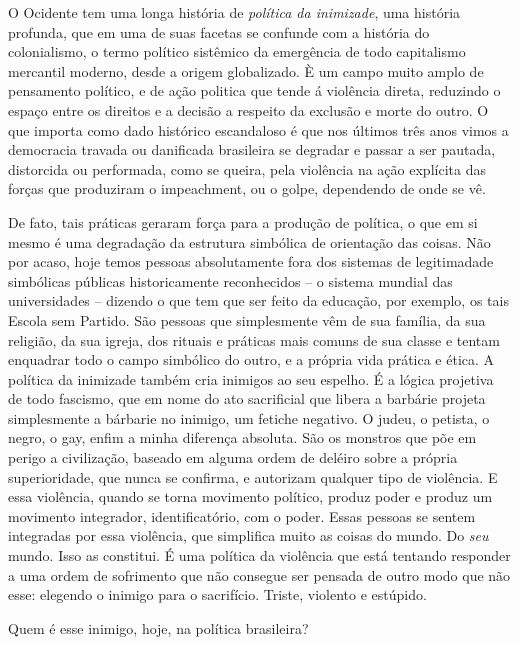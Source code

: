O Ocidente tem uma longa história de \emph{política da inimizade}, uma
história profunda, que em uma de suas facetas se confunde com a história
do colonialismo, o termo político sistêmico da emergência de todo
capitalismo mercantil moderno, desde a origem globalizado. È um campo
muito amplo de pensamento político, e de ação politica que tende á
violência direta, reduzindo o espaço entre os direitos e a decisão a
respeito da exclusão e morte do outro. O que importa como dado histórico
escandaloso é que nos últimos três anos vimos a democracia travada ou
danificada brasileira se degradar e passar a ser pautada, distorcida ou
performada, como se queira, pela violência na ação explícita das forças
que produziram o impeachment, ou o golpe, dependendo de onde se vê.

De fato, tais práticas geraram força para a produção de política, o que
em si mesmo é uma degradação da estrutura simbólica de orientação das
coisas. Não por acaso, hoje temos pessoas absolutamente fora dos
sistemas de legitimadade simbólicas públicas historicamente reconhecidos
-- o sistema mundial das universidades -- dizendo o que tem que ser
feito da educação, por exemplo, os tais Escola sem Partido. São pessoas
que simplesmente vêm de sua família, da sua religião, da sua igreja, dos
rituais e práticas mais comuns de sua classe e tentam enquadrar todo o
campo simbólico do outro, e a própria vida prática e ética. A política
da inimizade também cria inimigos ao seu espelho. É a lógica projetiva
de todo fascismo, que em nome do ato sacrificial que libera a barbárie
projeta simplesmente a bárbarie no inimigo, um fetiche negativo. O
judeu, o petista, o negro, o gay, enfim a minha diferença absoluta. São
os monstros que põe em perigo a civilização, baseado em alguma ordem de
deléiro sobre a própria superioridade, que nunca se confirma, e
autorizam qualquer tipo de violência. E essa violência, quando se torna
movimento político, produz poder e produz um movimento integrador,
identificatório, com o poder. Essas pessoas se sentem integradas por
essa violência, que simplifica muito as coisas do mundo. Do \emph{seu}
mundo. Isso as constitui. É uma política da violência que está tentando
responder a uma ordem de sofrimento que não consegue ser pensada de
outro modo que não esse: elegendo o inimigo para o sacrifício. Triste,
violento e estúpido.

Quem é esse inimigo, hoje, na política brasileira?

